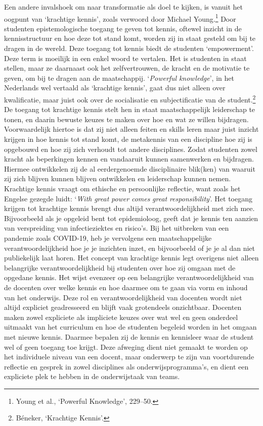 \documentclass[smallauthor, chapterhaspagenum, nochapterinheader, pagenuminheader,  bigchapnum,medium2, tocpages, garamond, titleinheader]{jote-book}
\begin{document}
	Een andere invalshoek om naar transformatie als doel te kijken, is vanuit het oogpunt van ‘krachtige kennis', zoals verwoord door Michael Young.\footnote{Young et al., ‘Powerful Knowledge', 229--50.} Door studenten epistemologische toegang te geven tot kennis, oftewel inzicht in de kennisstructuur en hoe deze tot stand komt, worden zij in staat gesteld om bij te dragen in de wereld. Deze toegang tot kennis biedt de studenten ‘empowerment'. Deze term is moeilijk in een enkel woord te vertalen. Het is studenten in staat stellen, maar ze daarnaast ook het zelfvertrouwen, de kracht en de motivatie te geven, om bij te dragen aan de maatschappij. ‘\emph{Powerful}\emph{ }\emph{knowledge}', in het Nederlands wel vertaald als ‘krachtige kennis', gaat dus niet alleen over kwalificatie, maar juist ook over de socialisatie en subjectificatie van de student.\footnote{Béneker, ‘Krachtige Kennis'.} De toegang tot krachtige kennis stelt hen in staat maatschappelijk leiderschap te tonen, en daarin bewuste keuzes te maken over hoe en wat ze willen bijdragen. Voorwaardelijk hiertoe is dat zij niet alleen feiten en skills leren maar juist inzicht krijgen in hoe kennis tot stand komt, de metakennis van een discipline hoe zij is opgebouwd en hoe zij zich verhoudt tot andere disciplines. Zodat studenten zowel kracht als beperkingen kennen en vandaaruit kunnen samenwerken en bijdragen. Hiermee ontwikkelen zij de al eerdergenoemde disciplinaire blik(ken) van waaruit zij zich blijven kunnen blijven ontwikkelen en leiderschap kunnen nemen. Krachtige kennis vraagt om ethische en persoonlijke reflectie, want zoals het Engelse gezegde luidt: ‘\emph{With}\emph{ }\emph{great}\emph{ power }\emph{comes}\emph{ }\emph{great}\emph{ }\emph{responsibility}'. Het toegang krijgen tot krachtige kennis brengt dus altijd verantwoordelijkheid met zich mee. Bijvoorbeeld als je opgeleid bent tot epidemioloog, geeft dat je kennis ten aanzien van verspreiding van infectieziektes en risico's. Bij het uitbreken van een pandemie zoals COVID-19, heb je vervolgens een maatschappelijke verantwoordelijkheid hoe je je inzichten inzet, en bijvoorbeeld of je je al dan niet publiekelijk laat horen. Het concept van krachtige kennis legt overigens niet alleen belangrijke verantwoordelijkheid bij studenten over hoe zij omgaan met de opgedane kennis. Het wijst evenzeer op een belangrijke verantwoordelijkheid van de docenten over welke kennis en hoe daarmee om te gaan via vorm en inhoud van het onderwijs. Deze rol en verantwoordelijkheid van docenten wordt niet altijd expliciet geadresseerd en blijft vaak grotendeels onzichtbaar. Docenten maken zowel expliciete als impliciete keuzes over wat wel en geen onderdeel uitmaakt van het curriculum en hoe de studenten begeleid worden in het omgaan met nieuwe kennis. Daarmee bepalen zij de kennis en kennisleer waar de student wel of geen toegang toe krijgt. Deze afweging dient niet gemaakt te worden op het individuele niveau van een docent, maar onderwerp te zijn van voortdurende reflectie en gesprek in zowel disciplines als onderwijsprogramma's, en dient een expliciete plek te hebben in de onderwijstaak van teams.
\end{document}
